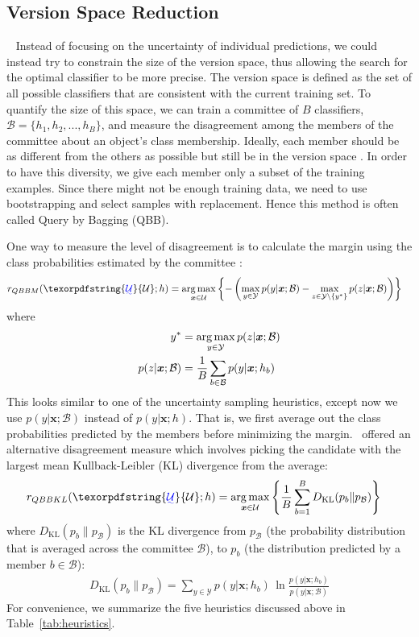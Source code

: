 \documentclass[fleqn,10pt,lineno]{wlpeerj} %
\newcommand{\B}{\mathcal{B}}
\newcommand{\Y}{\mathcal{Y}}
\newcommand{\Unlabeled}{\mathcal{U}}
\newcommand*{\argmax}{\operatornamewithlimits{arg\,max}\limits}
\providecommand{\DIFaddtex}[1]{{\protect\color{blue}\uwave{#1}}} %
\providecommand{\DIFaddbegin}{} %
\providecommand{\DIFaddend}{} %
\providecommand{\DIFdelbegin}{} %
\providecommand{\DIFdelend}{} %
\providecommand{\DIFadd}[1]{\texorpdfstring{\DIFaddtex{#1}}{#1}} %
\begin{document}
\subsection{Version Space Reduction}~\label{subsec:version}
Instead of focusing on the uncertainty of individual predictions, we could
instead try to constrain the size of the version space, thus allowing the
search for the optimal classifier to be more precise. The version space is
defined as the set of all possible classifiers that are consistent with the
current training set. To quantify the size of this space, we can train a
committee of $B$ classifiers, $\B = \{h_1, h_2, ..., h_B\}$, and measure the
disagreement among the members of the committee about an object's class
membership. Ideally, each member should be as different from the others as
possible but still be in the version space \citep{melville04}. In order to have
this diversity, we give each member only a subset of the training examples.
Since there might not be enough training data, we need to use bootstrapping and
select samples with replacement. Hence this method is often called Query by
Bagging (QBB).

One way to measure the level of disagreement is to calculate the margin using
the class probabilities estimated by the committee \citep{melville04}:
\begin{align}
	r_{QBBM}(\DIFdelbegin %
\DIFdelend \DIFaddbegin \DIFadd{\Unlabeled}\DIFaddend ; h) &= \argmax_{\bm{x} \in \Unlabeled}
	\left\{ - \left( \max_{y \in \Y} p(y | \bm{x}; \B) -
	\max_{z \in \Y \setminus \{y^*\}} p(z | \bm{x}; \B) \right) \right\}
\end{align}
where
\begin{align}
	y^* &= \argmax_{y \in \Y} p(z | \bm{x}; \B) \\
	p(z | \bm{x}; \B) &= \dfrac{1}{B} \sum_{b \in \B} p(y | \bm{x}; h_b)
\end{align}
This looks similar to one of the uncertainty sampling heuristics, except now we
use $p(y | \bm{x}; \B)$ instead of $ p(y | \bm{x}; h)$. That is, we first
average out the class probabilities predicted by the members before minimizing
the margin.~\cite{mccallum98} offered an alternative disagreement measure which
involves picking the candidate with the largest mean Kullback-Leibler (KL)
divergence from the average:
\begin{align}
	r_{QBBKL}(\DIFdelbegin %
\DIFdelend \DIFaddbegin \DIFadd{\Unlabeled}\DIFaddend ; h) &= \argmax_{\bm{x} \in \Unlabeled}
	\left\{ \dfrac{1}{B}
	\sum_{b=1}^B D_{\mathrm{KL}}(p_b\|p_\B) \right\}
\end{align}
where $D_{\mathrm{KL}}(p_b\|p_\B)$ is the KL divergence from $p_\B$ (the
probability distribution that is averaged across the committee $\B$), to $p_b$
(the distribution predicted by a member $b \in \B$):
\begin{align}
	D_{\mathrm{KL}}(p_b\|p_\B) = \sum_{y \in \Y} p(y | \bm{x}; h_b) \,
								 \ln\frac{p(y | \bm{x}; h_b)}{p(y | \bm{x}; \B)}
\end{align}
For convenience, we summarize the five heuristics discussed above in
Table~\ref{tab:heuristics}.
\end{document}
